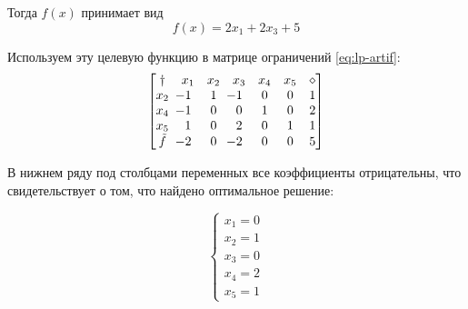 Тогда $f(x)$ принимает вид
\begin{equation*}
  f(x) = 2x_1+2x_3+5
\end{equation*}

Используем эту целевую функцию в матрице ограничений \eqref{eq:lp-artif}:
\begin{equation*}
  \begin{bmatrix}
    \dagger & x_1 & x_2 & x_3 & x_4 & x_5 & \diamond\\
    x_2 &\mm{1}& 1 &\mm{1}& 0 & 0 & 1\\
    x_4 &\mm{1}& 0 &  0 & 1 & 0 & 2\\
    x_5 &  1 & 0 &  2 & 0 & 1 & 1\\
    \tilde{f} & \mm{2} & 0 & \mm{2} & 0 & 0 & 5
  \end{bmatrix}
\end{equation*}

В нижнем ряду под столбцами переменных все коэффициенты отрицательны,
что свидетельствует о том, что найдено оптимальное решение:

\begin{equation}
  \begin{cases}
    x_1 = 0\\
    x_2 = 1\\
    x_3 = 0\\
    x_4 = 2\\
    x_5 = 1
  \end{cases}
\end{equation}
